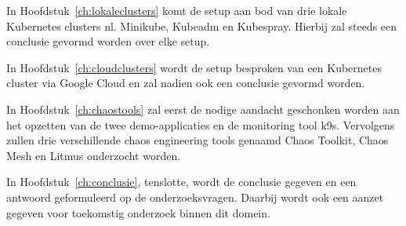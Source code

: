 In Hoofdstuk~\ref{ch:lokaleclusters} komt de setup aan bod van drie lokale Kubernetes clusters nl. Minikube, Kubeadm en Kubespray. Hierbij zal steeds een conclusie gevormd worden over elke setup.

In Hoofdstuk~\ref{ch:cloudclusters} wordt de setup besproken van een Kubernetes cluster via Google Cloud en zal nadien ook een conclusie gevormd worden.

In Hoofdstuk~\ref{ch:chaostools} zal eerst de nodige aandacht geschonken worden aan het opzetten van de twee demo-applicaties en de monitoring tool k9s. Vervolgens zullen drie verschillende chaos engineering tools genaamd Chaos Toolkit, Chaos Mesh en Litmus onderzocht worden. 

In Hoofdstuk~\ref{ch:conclusie}, tenslotte, wordt de conclusie gegeven en een antwoord geformuleerd op de onderzoeksvragen. Daarbij wordt ook een aanzet gegeven voor toekomstig onderzoek binnen dit domein.